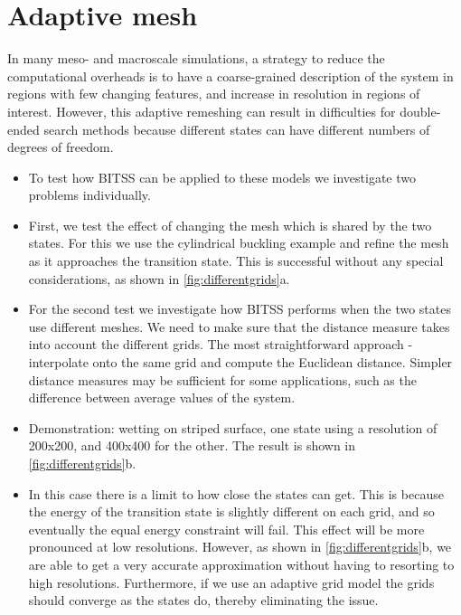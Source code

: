 \documentclass[aps,twocolumn]{revtex4}
\begin{document}
\section{Adaptive mesh}
In many meso- and macroscale simulations, a strategy to reduce the computational overheads is to have a coarse-grained description of the system in regions with few changing features, and increase in resolution in regions of interest. However, this adaptive remeshing can result in difficulties for double-ended search methods because different states can have different numbers of degrees of freedom.

\begin{itemize}
\item
To test how BITSS can be applied to these models we investigate two problems individually.
\item
First, we test the effect of changing the mesh which is shared by the two states.
For this we use the cylindrical buckling example and refine the mesh as it approaches the transition state.
This is successful without any special considerations, as shown in \cref{fig:differentgrids}a.
\item
For the second test we investigate how BITSS performs when the two states use different meshes.
We need to make sure that the distance measure takes into account the different grids.
The most straightforward approach - interpolate onto the same grid and compute the Euclidean distance.
Simpler distance measures may be sufficient for some applications, such as the difference between average values of the system.
\item
Demonstration: wetting on striped surface, one state using a resolution of 200x200, and 400x400 for the other. The result is shown in \cref{fig:differentgrids}b.
\item
In this case there is a limit to how close the states can get. This is because the energy of the transition state is slightly different on each grid, and so eventually the equal energy constraint will fail. This effect will be more pronounced at low resolutions. However, as shown in \cref{fig:differentgrids}b, we are able to get a very accurate approximation without having to resorting to high resolutions. Furthermore, if we use an adaptive grid model the grids should converge as the states do, thereby eliminating the issue.
\end{itemize}
\end{document}
